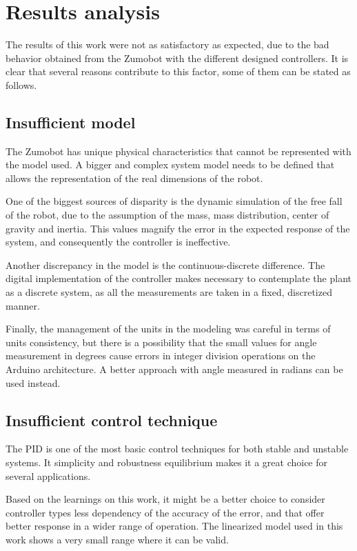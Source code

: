 \section{Results analysis}

The results of this work were not as satisfactory as expected, due to the bad behavior obtained from the Zumobot with the different designed controllers. It is clear that several reasons contribute to this factor, some of them can be stated as follows.

\subsection{Insufficient model}

The Zumobot has unique physical characteristics that cannot be represented with the model used. A bigger and complex system model needs to be defined that allows the representation of the real dimensions of the robot.

One of the biggest sources of disparity is the dynamic simulation of the free fall of the robot, due to the assumption of the mass, mass distribution, center of gravity and inertia. This values magnify the error in the expected response of the system, and consequently the controller is ineffective.

Another discrepancy in the model is the continuous-discrete difference. The digital implementation of the controller makes necessary to contemplate the plant as a discrete system, as all the measurements are taken in a fixed, discretized manner.

Finally, the management of the units in the modeling was careful in terms of units consistency, but there is a possibility that the small values for angle measurement in degrees cause errors in integer division operations on the Arduino architecture. A better approach with angle measured in radians can be used instead.

\subsection{Insufficient control technique}

The PID is one of the most basic control techniques for both stable and unstable systems. It simplicity and robustness equilibrium makes it a great choice for several applications.

Based on the learnings on this work, it might be a better choice to consider controller types less dependency of the accuracy of the error, and that offer better response in a wider range of operation. The linearized model used in this work shows a very small range where it can be valid.
